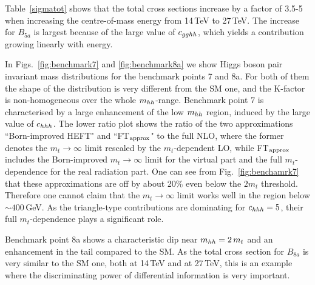 %
Table~\ref{sigmatot} shows that the total cross sections increase by a factor of 3.5-5 when increasing the centre-of-mass energy from 14\,TeV to 27\,TeV. The increase for $B_{5a}$ is largest because of the large value of $c_{gghh}$, which yields a contribution growing linearly with energy.




In Figs.~\ref{fig:benchmark7} and \ref{fig:benchmark8a} we show Higgs boson pair invariant mass distributions for the benchmark points 7 and 8a. 
For both of them the shape of the distribution is very different from the SM one, and the K-factor is non-homogeneous over the whole $m_{hh}$-range. Benchmark point 7 is characterised by a large enhancement of the low $m_{hh}$ region, induced by the large value of $c_{hhh}$. The lower ratio plot shows the ratio of the two approximations ``Born-improved HEFT" and ``FT$_{\rm{approx}}$" to the full NLO, where the former denotes the $m_t\to\infty$ limit rescaled by the $m_t$-dependent LO, while FT$_{\rm{approx}}$ includes the Born-improved $m_t\to\infty$ limit for the virtual part and the full $m_t$-dependence for the real radiation part. One can see from Fig.~\ref{fig:benchamrk7} that these approximations are off by about 20\% even below the $2m_t$ threshold. Therefore one cannot claim that the $m_t\to \infty$ limit works well in the region below $\sim 400$\,GeV. As the triangle-type contributions are dominating for $c_{hhh}=5$, their full $m_t$-dependence plays a significant role. 

Benchmark point 8a shows a characteristic dip near $m_{hh}=2\,m_t$ and an enhancement in the tail compared to the SM. 
As the total cross section for $B_{8a}$ is very similar to the SM one, both at 14\,TeV and at 27\,TeV, this is an example where the discriminating power of differential information is very important.

